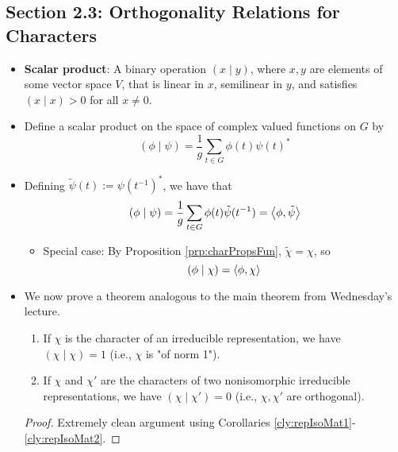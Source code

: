 \documentclass[../notes.tex]{subfiles}
\begin{document}
\subsection*{Section 2.3: Orthogonality Relations for Characters}
\begin{itemize}
    \item \textbf{Scalar product}: A binary operation $(x\mid y)$, where $x,y$ are elements of some vector space $V$, that is linear in $x$, semilinear in $y$, and satisfies $(x\mid x)>0$ for all $x\neq 0$.
    \item Define a scalar product on the space of complex valued functions on $G$ by
    \begin{equation*}
        (\phi\mid\psi) = \frac{1}{g}\sum_{t\in G}\phi(t)\psi(t)^*
    \end{equation*}
    \item Defining $\tilde{\psi}(t):=\psi(t^{-1})^*$, we have that
    \begin{equation*}
        (\phi\mid\psi) = \frac{1}{g}\sum_{t\in G}\phi(t)\tilde{\psi}(t^{-1})
        = \left\langle{\phi,\tilde{\psi}}\right\rangle
    \end{equation*}
    \begin{itemize}
        \item Special case: By Proposition \ref{prp:charPropsFun}, $\tilde{\chi}=\chi$, so
        \begin{equation*}
            (\phi\mid\chi) = \left\langle{\phi,\chi}\right\rangle
        \end{equation*}
    \end{itemize}
    \item We now prove a theorem analogous to the main theorem from Wednesday's lecture.
    \setcounter{theorem}{2}
    \begin{theorem}\label{trm:charOrthonormal}
        \leavevmode
        \begin{enumerate}[label={\textup{(\roman*)}}]
            \item If $\chi$ is the character of an irreducible representation, we have $(\chi\mid\chi)=1$ (i.e., $\chi$ is "of norm 1").
            \item If $\chi$ and $\chi'$ are the characters of two nonisomorphic irreducible representations, we have $(\chi\mid\chi')=0$ (i.e., $\chi,\chi'$ are orthogonal).
        \end{enumerate}
        \begin{proof}
            Extremely clean argument using Corollaries \ref{cly:repIsoMat1}-\ref{cly:repIsoMat2}.
        \end{proof}

\end{theorem}
\end{itemize}
\end{document}
